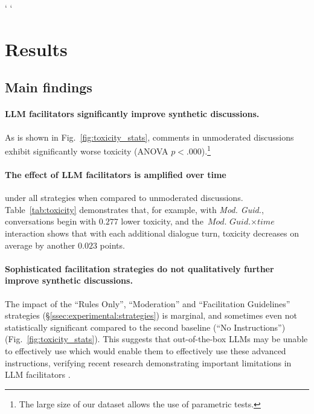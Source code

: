 `%
`%
%

\section{Results}
\label{sec:results}


\subsection{Main findings}

\paragraph{\ac{LLM} facilitators significantly improve synthetic discussions.} As is shown in Fig.~\ref{fig:toxicity_stats}, comments in unmoderated discussions exhibit significantly worse toxicity (ANOVA $p<.000$).\footnote{The large size of our dataset allows the use of parametric tests.} 

\paragraph{The effect of \ac{LLM} facilitators is amplified over time} under all strategies when compared to unmoderated discussions. Table~\ref{tab:toxicity} demonstrates that, for example, with \textit{Mod. Guid.}, conversations begin with $0.277$ lower toxicity, and the $\textit{Mod. Guid.} \times \textit{time}$ interaction shows that with each additional dialogue turn, toxicity decreases on average by another $0.023$ points.

\paragraph{Sophisticated facilitation strategies do not qualitatively further improve synthetic discussions.} The impact of the ``Rules Only'', ``Moderation'' and ``Facilitation Guidelines''  strategies (\S\ref{ssec:experimental:strategies}) is marginal, and sometimes even not statistically significant compared to the second baseline (``No Instructions'') (Fig.~\ref{fig:toxicity_stats}). This suggests that out-of-the-box \acp{LLM} may be unable to effectively use which would enable them to effectively use these advanced instructions, verifying recent research demonstrating important limitations in \ac{LLM} facilitators \cite{cho-etal-2024-language}. %

